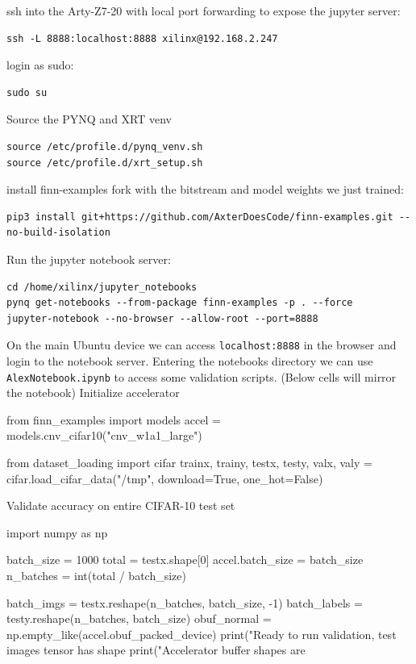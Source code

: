 \documentclass[11pt]{article}
\begin{document}
ssh into the Arty-Z7-20 with local port forwarding to expose the jupyter server:
\begin{verbatim}
ssh -L 8888:localhost:8888 xilinx@192.168.2.247
\end{verbatim}
login as sudo:
\begin{verbatim}
sudo su
\end{verbatim}
Source the PYNQ and XRT venv
\begin{verbatim}
source /etc/profile.d/pynq_venv.sh
source /etc/profile.d/xrt_setup.sh
\end{verbatim}
install finn-examples fork with the bitstream and model weights we just trained:
\begin{verbatim}
pip3 install git+https://github.com/AxterDoesCode/finn-examples.git --no-build-isolation
\end{verbatim}
Run the jupyter notebook server:
\begin{verbatim}
cd /home/xilinx/jupyter_notebooks
pynq get-notebooks --from-package finn-examples -p . --force
jupyter-notebook --no-browser --allow-root --port=8888
\end{verbatim}
On the main Ubuntu device we can access \verb+localhost:8888+ in the browser and login to the notebook server.
Entering the notebooks directory we can use \verb+AlexNotebook.ipynb+ to access some validation scripts.
(Below cells will mirror the notebook)
Initialize accelerator
\begin{jupytercell}
from finn_examples import models
accel = models.cnv_cifar10("cnv_w1a1_large")
\end{jupytercell}
\begin{jupytercell}
from dataset_loading import cifar
trainx, trainy, testx, testy, valx, valy = cifar.load_cifar_data("/tmp", download=True, one_hot=False)
\end{jupytercell}
Validate accuracy on entire CIFAR-10 test set
\begin{jupytercell}
import numpy as np

batch_size = 1000
total = testx.shape[0]
accel.batch_size = batch_size
n_batches = int(total / batch_size)

batch_imgs = testx.reshape(n_batches, batch_size, -1)
batch_labels = testy.reshape(n_batches, batch_size)
obuf_normal = np.empty_like(accel.obuf_packed_device)
print("Ready to run validation, test images tensor has shape %
print("Accelerator buffer shapes are %
\end{jupytercell}
\end{document}
